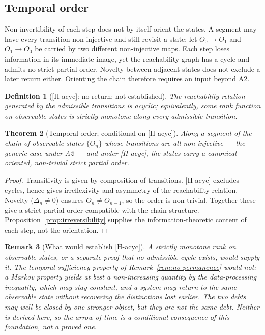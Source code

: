 \documentclass[11pt,a4paper]{article}
\newtheorem{theorem}{Theorem}[section]
\newtheorem{definition}[theorem]{Definition}
\newtheorem{remark}[theorem]{Remark}
\begin{document}
  \subsection{Temporal order}

    Non-invertibility of each step does not by itself orient the states.
    A segment may have every transition non-injective and still revisit a state: let
    $O_0 \to O_1$ and $O_1 \to O_0$ be carried by two different non-injective maps.
    Each step loses information in its immediate image, yet the reachability graph has a cycle and
    admits no strict partial order.
    Novelty between adjacent states does not exclude a later return either.
    Orienting the chain therefore requires an input beyond A2.

    \begin{definition}[{[H-acyc]}: no return; not established]
      \label{hyp:acyclic}
      The reachability relation generated by the admissible transitions is acyclic; equivalently,
      some rank function on observable states is strictly monotone along every admissible
      transition.
    \end{definition}

    \begin{theorem}[Temporal order; conditional on {[H-acyc]}]
      \label{thm:temporal-order}
      Along a segment of the chain of observable states $\{O_n\}$ whose transitions are all
      non-injective --- the generic case under A2 --- and under \textup{[H-acyc]}, the states carry
      a canonical oriented, non-trivial strict partial order.
    \end{theorem}

    \begin{proof}
      Transitivity is given by composition of transitions.
      \textup{[H-acyc]} excludes cycles, hence gives irreflexivity and asymmetry of the
      reachability relation.
      Novelty ($\Delta_n \neq 0$) ensures $O_n \neq O_{n-1}$, so the order is non-trivial.
      Together these give a strict partial order compatible with the chain structure.
      Proposition~\ref{prop:irreversibility} supplies the information-theoretic content of each
      step, not the orientation.
    \end{proof}

    \begin{remark}[What would establish {[H-acyc]}]
      \label{rem:acyclic-open}
      A strictly monotone rank on observable states, or a separate proof that no admissible cycle
      exists, would supply it.
      The temporal sufficiency property of Remark~\ref{rem:no-permanence} would not: a Markov
      property yields at best a non-increasing quantity by the data-processing inequality, which
      may stay constant, and a system may return to the same observable state without recovering
      the distinctions lost earlier.
      The two debts may well be closed by one stronger object, but they are not the same debt.
      Neither is derived here, so the arrow of time is a conditional consequence of this
      foundation, not a proved one.
    \end{remark}
\end{document}
